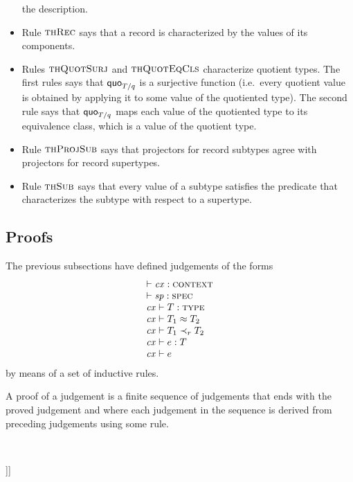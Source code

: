 \begin{itemize}
the description.
\item
Rule $\textsc{thRec}$ says that a record is characterized by the values of its
components.
\item
Rules $\textsc{thQuotSurj}$ and $\textsc{thQuotEqCls}$ characterize quotient types. The
first rules says that $\mathsf{quo}_{T/q}$ is a surjective function (i.e.\ every quotient
value is obtained by applying it to some value of the quotiented type). The
second rule says that $\mathsf{quo}_{T/q}$ maps each value of the quotiented type to its
equivalence class, which is a value of the quotient type.
\item
Rule $\textsc{thProjSub}$ says that projectors for record subtypes agree with
projectors for record supertypes.
\item
Rule $\textsc{thSub}$ says that every value of a subtype satisfies the predicate that
characterizes the subtype with respect to a supertype.
\end{itemize}

\subsection{Proofs}

The previous subsections have defined judgements of the forms
\[
\begin{array}{l}
\vdash\mathit{cx}:\textsc{context} \\
\vdash\mathit{sp}:\textsc{spec} \\
\mathit{cx}\vdash T:\textsc{type} \\
\mathit{cx}\vdash T_1\approx T_2 \\
\mathit{cx}\vdash T_1\prec_{r}T_2 \\
\mathit{cx}\vdash e:T \\
\mathit{cx}\vdash e
\end{array}
\]
by means of a set of inductive rules.

A proof of a judgement is a finite sequence of judgements that ends with the
proved judgement and where each judgement in the sequence is derived from
preceding judgements using some rule.

\

\noindent
[[[TO DO: Make sure that the rules for theorems are ``sufficient'', i.e.\ all
truths ``of interest'' are indeed theorems derivable from the rules. Even
though higher-order logic is notoriously incomplete, in practice theorem
provers like PVS and HOL are sufficient to prove desired properties of
formalized concepts without running into theoretical limitations. Perhaps the
requirement boils down to prove completeness with respect to so-called
``general models'' (cf.\ \cite{andrews}).]]]
